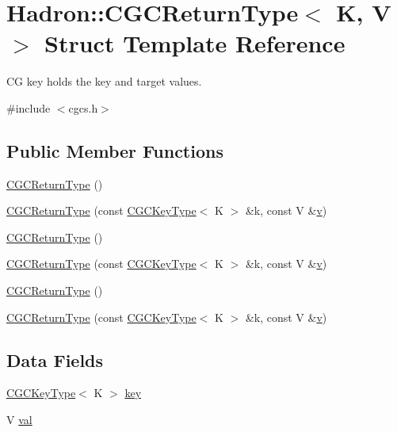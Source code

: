 \hypertarget{structHadron_1_1CGCReturnType}{}\section{Hadron\+:\+:C\+G\+C\+Return\+Type$<$ K, V $>$ Struct Template Reference}
\label{structHadron_1_1CGCReturnType}


CG key holds the key and target values.  




{\ttfamily \#include $<$cgcs.\+h$>$}

\subsection*{Public Member Functions}
\begin{DoxyCompactItemize}
\item 
\mbox{\hyperlink{structHadron_1_1CGCReturnType_a47df1076ea565f8d6c6126f26707aa21}{C\+G\+C\+Return\+Type}} ()
\item 
\mbox{\hyperlink{structHadron_1_1CGCReturnType_ad8d827992553e890df5f1e05876cc63e}{C\+G\+C\+Return\+Type}} (const \mbox{\hyperlink{structHadron_1_1CGCKeyType}{C\+G\+C\+Key\+Type}}$<$ K $>$ \&k, const V \&\mbox{\hyperlink{adat__devel_2lib_2hadron_2hadron__timeslice_8cc_a716fc87f5e814be3ceee2405ed6ff22a}{v}})
\item 
\mbox{\hyperlink{structHadron_1_1CGCReturnType_a47df1076ea565f8d6c6126f26707aa21}{C\+G\+C\+Return\+Type}} ()
\item 
\mbox{\hyperlink{structHadron_1_1CGCReturnType_ad8d827992553e890df5f1e05876cc63e}{C\+G\+C\+Return\+Type}} (const \mbox{\hyperlink{structHadron_1_1CGCKeyType}{C\+G\+C\+Key\+Type}}$<$ K $>$ \&k, const V \&\mbox{\hyperlink{adat__devel_2lib_2hadron_2hadron__timeslice_8cc_a716fc87f5e814be3ceee2405ed6ff22a}{v}})
\item 
\mbox{\hyperlink{structHadron_1_1CGCReturnType_a47df1076ea565f8d6c6126f26707aa21}{C\+G\+C\+Return\+Type}} ()
\item 
\mbox{\hyperlink{structHadron_1_1CGCReturnType_ad8d827992553e890df5f1e05876cc63e}{C\+G\+C\+Return\+Type}} (const \mbox{\hyperlink{structHadron_1_1CGCKeyType}{C\+G\+C\+Key\+Type}}$<$ K $>$ \&k, const V \&\mbox{\hyperlink{adat__devel_2lib_2hadron_2hadron__timeslice_8cc_a716fc87f5e814be3ceee2405ed6ff22a}{v}})
\end{DoxyCompactItemize}
\subsection*{Data Fields}
\begin{DoxyCompactItemize}
\item 
\mbox{\hyperlink{structHadron_1_1CGCKeyType}{C\+G\+C\+Key\+Type}}$<$ K $>$ \mbox{\hyperlink{structHadron_1_1CGCReturnType_a1101bfc0c0d7cd166d32992058e4aa6c}{key}}
\item 
V \mbox{\hyperlink{structHadron_1_1CGCReturnType_ae84be939a57b9598ac24e018e399cc38}{val}}
\end{DoxyCompactItemize}


